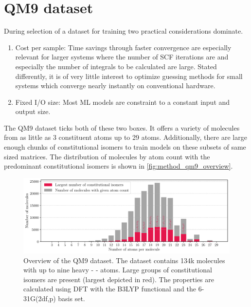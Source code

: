 \section{QM9 dataset \parencite{ref:data_qm9}}
\label{sec:qm9}
During selection of a dataset for training two practical considerations dominate. 
\begin{enumerate}
    \item Cost per sample: Time savings through faster convergence are especially relevant for larger systems where the number of SCF iterations are and especially the number of integrals to be calculated are large. Stated differently, it is of very little interest to optimize guessing methods for small systems which converge nearly instantly on conventional hardware. 
    \item Fixed I/O size: Most ML models are constraint to a constant input and output size. 
\end{enumerate}
The QM9 dataset \parencite{ref:article1_qm9,ref:article2_qm9} ticks both of these two boxes. It offers a variety of molecules from as little as 3 constituent atoms up to 29 atoms. Additionally, there are large enough chunks of constitutional isomers to train models on these subsets of same sized matrices. The distribution of molecules by atom count with the predominant constitutional isomers is shown in \autoref{fig:method_qm9_overview}.
\begin{figure}[H]
    \centering
    \includegraphics[width=\textwidth]{../fig/qm9_general/qm9_overview_stacked_bar.pdf}
    \caption[QM9 dataset overview]{Overview of the QM9 dataset. The dataset contains 134k molecules with up to nine heavy -     - atoms. Large groups of constitutional isomers are present (largest depicted in red). The properties are calculated using DFT with the B3LYP functional and the 6-31G(2df,p) basis set.}
    \label{fig:method_qm9_overview}
\end{figure}
